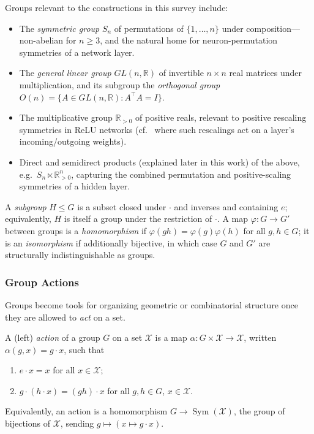 \documentclass[mathematics,review,submit,moreauthors]{Definitions/mdpi}
\begin{document}
\begin{Example}
\label{ex:groups}
Groups relevant to the constructions in this survey include:
\begin{itemize}
    \item The \emph{symmetric group} $S_n$ of permutations of
    $\{1, \dots, n\}$ under composition---non-abelian for $n \geq 3$, and the
    natural home for neuron-permutation symmetries of a network layer.
    \item The \emph{general linear group} $GL(n, \mathbb{R})$ of invertible
    $n \times n$ real matrices under multiplication, and its subgroup the
    \emph{orthogonal group} $O(n) = \{ A \in GL(n,\mathbb{R}) : A^\top A = I \}$.
    \item The multiplicative group $\mathbb{R}_{>0}$ of positive reals,
    relevant to positive rescaling symmetries in ReLU networks
    (cf.\  where such rescalings act
    on a layer's incoming/outgoing weights).
    \item Direct and semidirect products (explained later in this work) of the above, e.g.\
    $S_n \ltimes \mathbb{R}_{>0}^n$, capturing the combined permutation and
    positive-scaling symmetries of a hidden layer.
\end{itemize}
\end{Example}

A \emph{subgroup} $H \leq G$ is a subset closed under $\cdot$ and inverses
and containing $e$; equivalently, $H$ is itself a group under the restriction
of $\cdot$. A map $\varphi : G \to G'$ between groups is a
\emph{homomorphism} if $\varphi(g h) = \varphi(g)\varphi(h)$ for all
$g, h \in G$; it is an \emph{isomorphism} if additionally bijective, in which
case $G$ and $G'$ are structurally indistinguishable as groups.

\subsubsection{Group Actions}
\label{subsec:group-actions}

Groups become tools for organizing geometric or combinatorial structure once
they are allowed to \emph{act} on a set.

\begin{Definition}\label{def:group-action}
A (left) \emph{action} of a group $G$ on a set $\mathcal{X}$ is a map
$\alpha : G \times \mathcal{X} \to \mathcal{X}$, written $\alpha(g,x) = g \cdot x$, such that
\begin{enumerate}[label=(A\arabic*), leftmargin=*, labelsep=0.5em]
    \item $e \cdot x = x$ for all $x \in \mathcal{X}$;
    \item $g \cdot (h \cdot x) = (gh) \cdot x$ for all $g, h \in G$,
    $x \in \mathcal{X}$.
\end{enumerate}
Equivalently, an action is a homomorphism $G \to \operatorname{Sym}(\mathcal{X})$, the group
of bijections of $\mathcal{X}$, sending $g \mapsto (x \mapsto g \cdot x)$.
\end{Definition}
\end{document}
